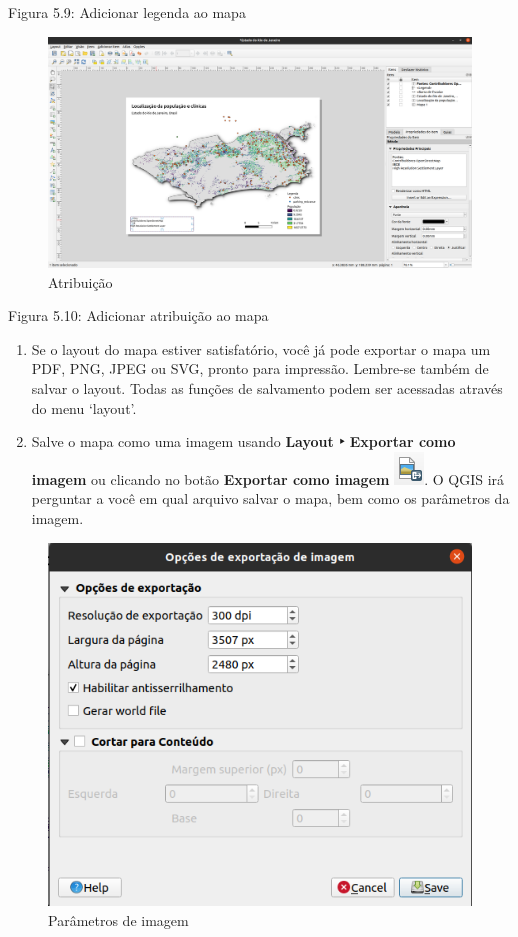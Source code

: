 \documentclass[
]{book}
\begin{document}
Figura 5.9: Adicionar legenda ao mapa

\begin{figure}
\centering
\includegraphics{media/modulo5/attribution.png}
\caption{Atribuição}
\end{figure}

Figura 5.10: Adicionar atribuição ao mapa

\begin{enumerate}
\def\labelenumi{\arabic{enumi}.}
\setcounter{enumi}{2}
\item
  Se o layout do mapa estiver satisfatório, você já pode exportar o mapa um PDF, PNG, JPEG ou SVG, pronto para impressão. Lembre-se também de salvar o layout. Todas as funções de salvamento podem ser acessadas através do menu `layout'.
\item
  Salve o mapa como uma imagem usando \textbf{Layout ‣ Exportar como imagem} ou clicando no botão \textbf{Exportar como imagem} \includegraphics{media/modulo5/export-image-btn.png}. O QGIS irá perguntar a você em qual arquivo salvar o mapa, bem como os parâmetros da imagem.
\end{enumerate}

\begin{figure}
\centering
\includegraphics{media/modulo5/img-parameters.png}
\caption{Parâmetros de imagem}
\end{figure}
\end{document}
